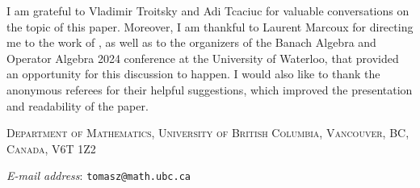 \documentclass[a4paper,12pt]{article}
\makeatletter
\theoremstyle{definition}
\numberwithin{equation}{section}
\numberwithin{thm}{section}
\newcommand{\Addresses}{{%
  \bigskip
  \footnotesize

\textsc{Department of Mathematics, University of British Columbia,
    Vancouver, BC, Canada, V6T 1Z2}\par\nopagebreak
  \textit{E-mail address}: \texttt{tomasz@math.ubc.ca}

}}
\makeatother
\begin{document}
I am grateful to Vladimir Troitsky and Adi Tcaciuc for valuable conversations on the topic of this paper. Moreover, I am thankful to Laurent Marcoux for directing me to the work of \cite{Ambrozie}, as well as to the organizers of the Banach Algebra and Operator Algebra 2024 conference at the University of Waterloo, that provided an opportunity for this discussion to happen. I would also like to thank the anonymous referees for their helpful suggestions, which improved the presentation and readability of the paper.


\Addresses
\end{document}
